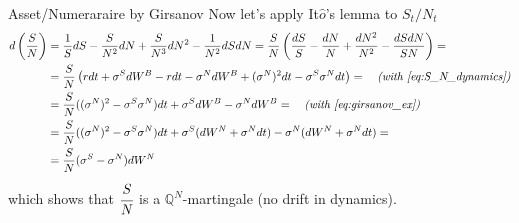 \documentclass{beamer}
\begin{document}
\begin{frame}{Asset/Numeraraire by Girsanov}
  Now let's apply It$\hat{o}$'s lemma to $S_t/N_t$
  \begin{equation*}
    \begin{aligned}
      d\left(\frac{S}{N}\right) &= \frac{1}{S}dS - \frac{S}{N^2}dN + \frac{S}{N^3}dN^2-\frac{1}{N^2}dSdN = \frac{S}{N}\left(\frac{dS}{S}-\frac{dN}{N}+\frac{dN^2}{N^2}-\frac{dSdN}{SN} \right) = \\
      &=\frac{S}{N}\left(rdt+\sigma^S dW^B - rdt - \sigma^N dW^B + (\sigma^N)^2 dt - \sigma^S\sigma^N dt \right) = \quad\textit{(with \cref{eq:S_N_dynamics})}\\
      &=\frac{S}{N}((\sigma^N)^2 - \sigma^S\sigma^N) dt + \sigma^S dW^B - \sigma^N dW^B = \quad\textit{(with \cref{eq:girsanov_ex})}\\
      &=\frac{S}{N}((\sigma^N)^2 - \sigma^S\sigma^N) dt + \sigma^S (dW^N + \sigma^N dt) - \sigma^N(dW^N+\sigma^Ndt) = \\
      &=\frac{S}{N}(\sigma^S - \sigma^N)dW^N 
      \end{aligned}
  \end{equation*}
  which shows that $\cfrac{S}{N}$ is a $\mathbb{Q}^N$-martingale (no drift in dynamics).
\end{frame}
\end{document}
